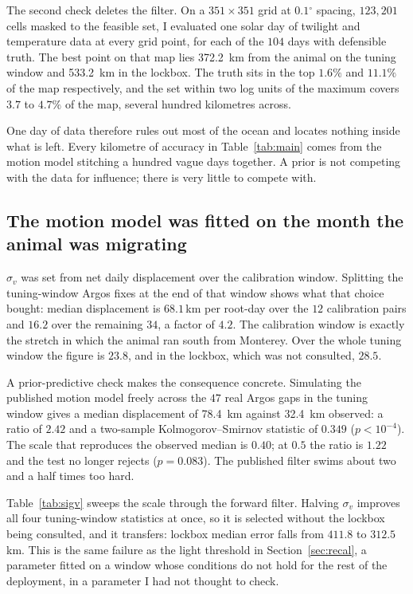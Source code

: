 \documentclass[conference]{IEEEtran}
\providecommand{\degree}{\ensuremath{^\circ}}
\begin{document}
The second check deletes the filter. On a $351 \times 351$ grid at
$0.1\degree$ spacing, $123{,}201$ cells masked to the feasible set, I evaluated
one solar day of twilight and temperature data at every grid point, for each of
the $104$ days with defensible truth. The best point on that map lies
\SI{372.2}{\km} from the animal on the tuning window and \SI{533.2}{\km} in the
lockbox. The truth sits in the top $1.6\%$ and $11.1\%$ of the map
respectively, and the set within two log units of the maximum covers $3.7$ to
$4.7\%$ of the map, several hundred kilometres across.

One day of data therefore rules out most of the ocean and locates nothing
inside what is left. Every kilometre of accuracy in Table~\ref{tab:main} comes
from the motion model stitching a hundred vague days together. A prior is not
competing with the data for influence; there is very little to compete with.

\subsection{The motion model was fitted on the month the animal was migrating}

$\sigma_v$ was set from net daily displacement over the calibration window.
Splitting the tuning-window Argos fixes at the end of that window shows what
that choice bought: median displacement is $68.1$\,\si{\km} per root-day over
the $12$ calibration pairs and $16.2$ over the remaining $34$, a factor of
$4.2$. The calibration window is exactly the stretch in which the animal ran
south from Monterey. Over the whole tuning window the figure is $23.8$, and in
the lockbox, which was not consulted, $28.5$.

A prior-predictive check makes the consequence concrete. Simulating the
published motion model freely across the $47$ real Argos gaps in the tuning
window gives a median displacement of \SI{78.4}{\km} against \SI{32.4}{\km}
observed: a ratio of $2.42$ and a two-sample Kolmogorov--Smirnov statistic of
$0.349$ ($p < 10^{-4}$). The scale that reproduces the observed median is
$0.40$; at $0.5$ the ratio is $1.22$ and the test no longer rejects
($p = 0.083$). The published filter swims about two and a half times too hard.

Table~\ref{tab:sigv} sweeps the scale through the forward filter. Halving
$\sigma_v$ improves all four tuning-window statistics at once, so it is
selected without the lockbox being consulted, and it transfers: lockbox median
error falls from $411.8$ to $312.5$\,\si{\km}. This is the same failure as the
light threshold in Section~\ref{sec:recal}, a parameter fitted on a window
whose conditions do not hold for the rest of the deployment, in a parameter I
had not thought to check.
\end{document}
